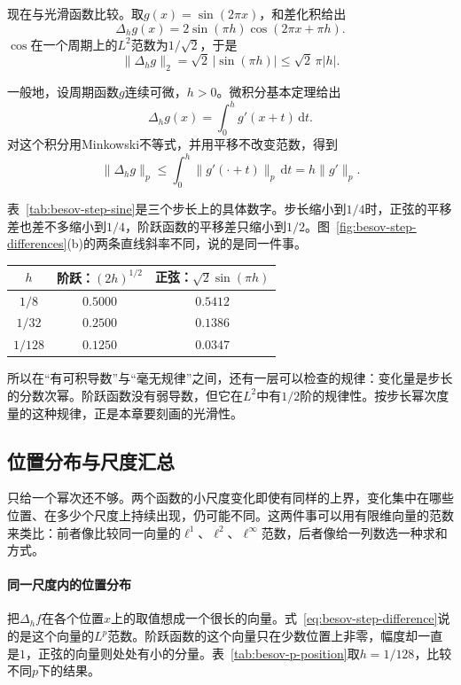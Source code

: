 现在与光滑函数比较。取$g(x)=\sin(2\pi x)$，和差化积给出
\[
 \Delta_hg(x)=2\sin(\pi h)\cos(2\pi x+\pi h).
\]
$\cos$在一个周期上的$L^2$范数为$1/\sqrt2$，于是
\[
 \lVert\Delta_hg\rVert_2=\sqrt2\,\lvert\sin(\pi h)\rvert\leq\sqrt2\,\pi\lvert h\rvert .
\]

一般地，设周期函数$g$连续可微，$h>0$。微积分基本定理给出
\[
 \Delta_hg(x)=\int_0^hg'(x+t)\,\mathrm dt .
\]
对这个积分用Minkowski不等式，并用平移不改变范数，得到
\begin{equation}
 \lVert\Delta_hg\rVert_p\leq\int_0^h\lVert g'(\cdot+t)\rVert_p\,\mathrm dt=h\lVert g'\rVert_p .
 \label{eq:besov-c1-difference}
\end{equation}

表~\ref{tab:besov-step-sine}是三个步长上的具体数字。步长缩小到$1/4$时，正弦的平移差也差不多缩小到$1/4$，阶跃函数的平移差只缩小到$1/2$。图~\ref{fig:besov-step-differences}(b)的两条直线斜率不同，说的是同一件事。

\begin{BookInlineTable}
  \centering
  \begin{tabular}{@{}ccc@{}}
    \toprule
    $h$ & 阶跃：$(2h)^{1/2}$ & 正弦：$\sqrt2\sin(\pi h)$\\
    \midrule
    $1/8$ & $0.5000$ & $0.5412$\\
    $1/32$ & $0.2500$ & $0.1386$\\
    $1/128$ & $0.1250$ & $0.0347$\\
    \bottomrule
  \end{tabular}
  \caption{阶跃函数与正弦函数的$L^2$平移差。}
  \label{tab:besov-step-sine}
\end{BookInlineTable}

所以在“有可积导数”与“毫无规律”之间，还有一层可以检查的规律：变化量是步长的分数次幂。阶跃函数没有弱导数，但它在$L^2$中有$1/2$阶的规律性。按步长幂次度量的这种规律，正是本章要刻画的光滑性。

\subsection{位置分布与尺度汇总}
\label{sec:besov-distribution-aggregation}

只给一个幂次还不够。两个函数的小尺度变化即使有同样的上界，变化集中在哪些位置、在多少个尺度上持续出现，仍可能不同。这两件事可以用有限维向量的范数来类比：前者像比较同一向量的$\ell^1$、$\ell^2$、$\ell^\infty$范数，后者像给一列数选一种求和方式。

\paragraph{同一尺度内的位置分布}
把$\Delta_hf$在各个位置$x$上的取值想成一个很长的向量。式~\eqref{eq:besov-step-difference}说的是这个向量的$L^p$范数。阶跃函数的这个向量只在少数位置上非零，幅度却一直是$1$，正弦的向量则处处有小的分量。表~\ref{tab:besov-p-position}取$h=1/128$，比较不同$p$下的结果。


